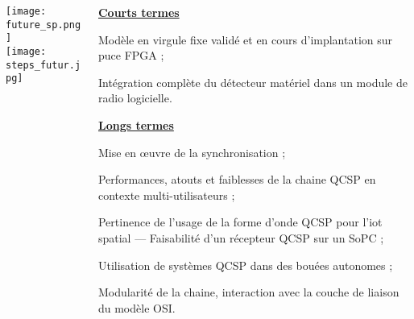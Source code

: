 \documentclass[../main.tex]{subfiles}
\begin{document}
\begin{frame}{\subsecname}
  \begin{columns}
    \begin{column}{.3 \linewidth}
      \hfill \texttt{[image: future\_sp.png]} \\
      \texttt{[image: steps\_futur.jpg]}
    \end{column}
    \begin{column}{.7 \linewidth}
      {\centering \underline{\textbf{Courts termes}}\par}
      \begin{ctrlitemize}{.2 em} \small
        \item Modèle en virgule fixe validé et en cours d'implantation sur puce FPGA ;
        \item Intégration complète du détecteur matériel dans un module de radio logicielle.
      \end{ctrlitemize}

      {\centering \underline{\textbf{Longs termes}}\par}
      \begin{ctrlitemize}{.2 em} \small
        \item Mise en œuvre de la synchronisation ;
        \item Performances, atouts et faiblesses de la chaine QCSP en contexte multi-utilisateurs ;
        \item Pertinence de l'usage de la forme d'onde QCSP pour l'\acrshort{iot} spatial --- Faisabilité d'un récepteur QCSP sur un SoPC ;
        \item Utilisation de systèmes QCSP dans des bouées autonomes ;
        \item Modularité de la chaine, interaction avec la couche de liaison du modèle OSI.
      \end{ctrlitemize}
    \end{column}
  \end{columns}
\end{frame}
\end{document}
